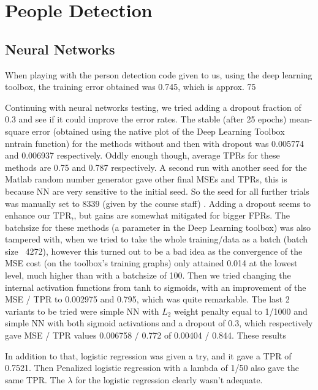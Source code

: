 \documentclass{article} %
\begin{document}
\section{People Detection}
\subsection{Neural Networks}
When playing with the person detection code given to us, using the deep learning toolbox, the training error obtained was 0.745, which is approx. 75%

Continuing with neural networks testing, we tried adding a dropout fraction of 0.3 and see if it could improve the error rates. The stable (after 25 epochs) mean-square error (obtained using the native plot of the Deep Learning Toolbox nntrain function) for the methods without and then with dropout was 0.005774 and 0.006937 respectively. Oddly enough though, average TPRs for these methods are 0.75 and 0.787 respectively. A second run with another seed for the Matlab random number generator gave other final MSEs and TPRs, this is because NN are very sensitive to the initial seed. So the seed for all further trials was manually set to 8339 (given by the course staff) . Adding a dropout seems to enhance our TPR,, but gains are somewhat mitigated for bigger FPRs. The batchsize for these methods (a parameter in the Deep Learning toolbox) was also tampered with, when we tried to take the whole training/data as a batch (batch size ~4272), however this turned out to be a bad idea as the convergence of the MSE cost (on the toolbox’s training graphs) only attained 0.014 at the lowest level, much higher than with a batchsize of 100. Then we tried changing the internal activation functions from tanh to sigmoids, with an improvement of the MSE / TPR to 0.002975 and 0.795, which was quite remarkable. The last 2 variants to be tried were simple NN with $L_2$ weight penalty equal to 1/1000 and simple NN with both sigmoid activations and a dropout of 0.3, which respectively gave MSE / TPR values 0.006758 / 0.772 of 0.00404 / 0.844. These results 

In addition to that, logistic regression was given a try, and it gave a TPR of 0.7521. Then Penalized logistic regression with a lambda of 1/50 also gave the same TPR. The $\lambda$ for the logistic regression clearly wasn’t adequate.
\end{document}
